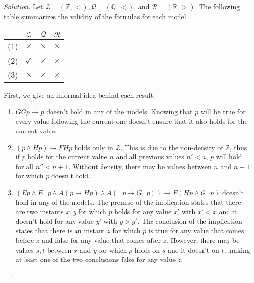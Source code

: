 \documentclass[12pt,a4paper]{report}
\theoremstyle{definition}
\newcommand{\Z}{\mathbb{Z}}                     %
\newcommand{\Q}{\mathbb{Q}}                     %
\newcommand{\R}{\mathbb{R}}                     %
\begin{document}
    \begin{proof}[Solution]
        Let $\mathcal{Z} = (\Z, <), \mathcal{Q} = (\Q, <)$, and $\mathcal{R} = (\R, >)$. The following table summarizes the validity of the formulas for each model.
        \begin{center}
            \begin{tabular}{c|ccc}
                & $\mathcal{Z}$ & $\mathcal{Q}$ & $\mathcal{R}$ \\
                \hline
                (1) & $\times$ & $\times$ & $\times$ \\
                (2) & $\checkmark$ & $\times$ & $\times$ \\
                (3) & $\times$ & $\times$ & $\times$ \\
            \end{tabular}
        \end{center}

        First, we give an informal idea behind each result:
        \begin{enumerate}
            \item $GGp \to p$ doesn't hold in any of the models. Knowing that $p$ will be true for every value following the current one doesn't ensure that it also holds for the current value.
            \item $(p \land Hp) \to F Hp$ holds only in $\mathcal{Z}$. This is due to the non-density of $\Z$, thus if $p$ holds for the current value $n$ and all previous values $n' < n$, $p$ will hold for all $n'' < n+1$. Without density, there may be values between $n$ and $n+1$ for which $p$ doesn't hold.
            \item $(Ep \land E \lnot p \land A(p \to Hp) \land A(\lnot p \to G \lnot p)) \to E(Hp \land G \lnot p)$ doesn't hold in any of the models. The premise of the implication states that there are two instants $x,y$ for which $p$ holds for any value $x'$ with $x' < x$ and it doesn't hold for any value $y'$ with $y > y'$. The conclusion of the implication states that there is an instant $z$ for which $p$ is true for any value that comes before $z$ and false for any value that comes after $z$. However, there may be values $s,t$ between $x$ and $y$ for which $p$ holds on $s$ and it doesn't on $t$, making at least one of the two conclusions false for any value $z$.  
        \end{enumerate}
        

\end{proof}
\end{document}
